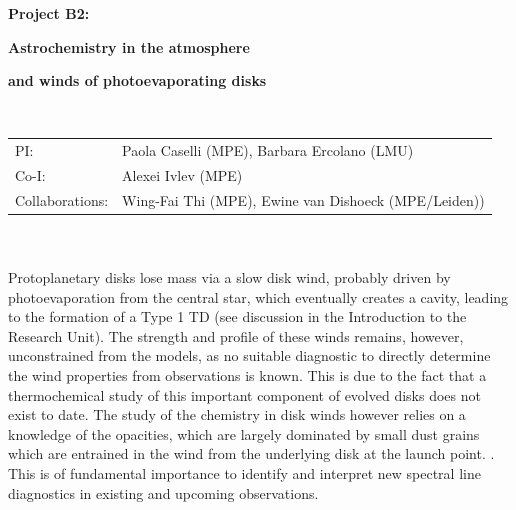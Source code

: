 \documentclass[10pt,fleqn,twoside]{article}
\begin{document}
\newpage


\setcounter{page}{1}

\centerline{\huge\bf\Tcol
%
%
%
%
%
 Project B2:}
\vspace{1em}

\centerline{\LARGE\bf\Tcol Astrochemistry in the atmosphere}\vspace{0.3em}
\centerline{\LARGE\bf\Tcol and winds of photoevaporating disks}

%
%
%
%
%
\vskip1.0cm


\\
\begin{tabular}{ll}
{\textsf{PI:}}                   & Paola Caselli (MPE), Barbara Ercolano (LMU) \\
{\textsf{Co-I:}}                & Alexei Ivlev (MPE)\\
{\textsf{Collaborations:}}      &Wing-Fai Thi (MPE), Ewine van Dishoeck (MPE/Leiden))\\
\end{tabular}


\vspace{1em}
 \\

\vspace{1em}
\\
Protoplanetary disks lose mass via a slow disk wind, probably driven
by photoevaporation from the central star, which eventually creates a
cavity, leading to the formation of a Type 1 TD (see discussion in the
Introduction to the Research Unit). The strength and profile of these
winds remains, however, unconstrained from the models, as no suitable
diagnostic to directly determine the wind properties from
observations is known. This is due to the fact that a thermochemical study of
this important component of evolved disks does not exist to date. The
study of the chemistry in disk winds however relies on a knowledge of
the opacities, which are 
largely dominated by small dust grains which are entrained in the wind
from the underlying disk at the launch point. . This is of fundamental importance to
identify and interpret new spectral line diagnostics in existing and
upcoming observations.  
\end{document}
